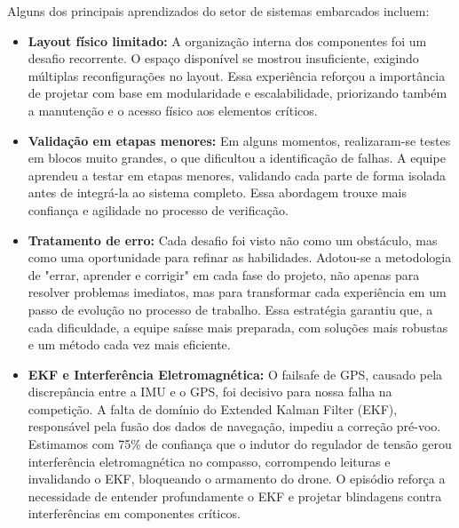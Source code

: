 Alguns dos principais aprendizados do setor de sistemas embarcados incluem:
\begin{itemize}
    \item \textbf{Layout físico limitado:} A organização interna dos componentes foi um desafio recorrente. O espaço disponível se mostrou insuficiente, exigindo múltiplas reconfigurações no layout. Essa experiência reforçou a importância de projetar com base em modularidade e escalabilidade, priorizando também a manutenção e o acesso físico aos elementos críticos.
    \item \textbf{Validação em etapas menores:} Em alguns momentos, realizaram-se testes em blocos muito grandes, o que dificultou a identificação de falhas. A equipe aprendeu a testar em etapas menores, validando cada parte de forma isolada antes de integrá-la ao sistema completo. Essa abordagem trouxe mais confiança e agilidade no processo de verificação.
    \item \textbf{Tratamento de erro:} Cada desafio foi visto não como um obstáculo, mas como uma oportunidade para refinar as habilidades. Adotou-se a metodologia de "errar, aprender e corrigir" em cada fase do projeto, não apenas para resolver problemas imediatos, mas para transformar cada experiência em um passo de evolução no processo de trabalho. Essa estratégia garantiu que, a cada dificuldade, a equipe saísse mais preparada, com soluções mais robustas e um método cada vez mais eficiente.
    \item \textbf{EKF e Interferência Eletromagnética:} O failsafe de GPS, causado pela discrepância entre a IMU e o GPS, foi decisivo para nossa falha na competição. A falta de domínio do Extended Kalman Filter (EKF), responsável pela fusão dos dados de navegação, impediu a correção pré-voo. Estimamos com 75\% de confiança que o indutor do regulador de tensão gerou interferência eletromagnética no compasso, corrompendo leituras e invalidando o EKF, bloqueando o armamento do drone. O episódio reforça a necessidade de entender profundamente o EKF e projetar blindagens contra interferências em componentes críticos.

\end{itemize}